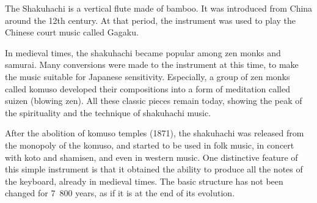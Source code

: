 ﻿The Shakuhachi is a vertical flute made of bamboo. It was introduced from China around the 12th century. At that period, the instrument was used to play the Chinese court music called Gagaku.

\par

In medieval times, the shakuhachi became popular 
among zen monks and samurai. Many conversions were made to the instrument at this time, to make the music suitable
for Japanese sensitivity. Especially, a group of zen monks called komuso developed their compositions into a form of    
meditation called suizen (blowing zen). All these classic pieces remain today, showing the peak of the spirituality and the 
technique of shakuhachi music.

\par

After the abolition of komuso temples (1871), the shakuhachi was released from the monopoly of the komuso, and started to be used in folk music, in concert with koto and shamisen, and even in western 
music. One distinctive feature of this simple instrument is that it obtained the ability to produce all the notes
of the keyboard, already in medieval times. The basic structure has not been changed for 7~800 years, as if it is at the end of its evolution.
